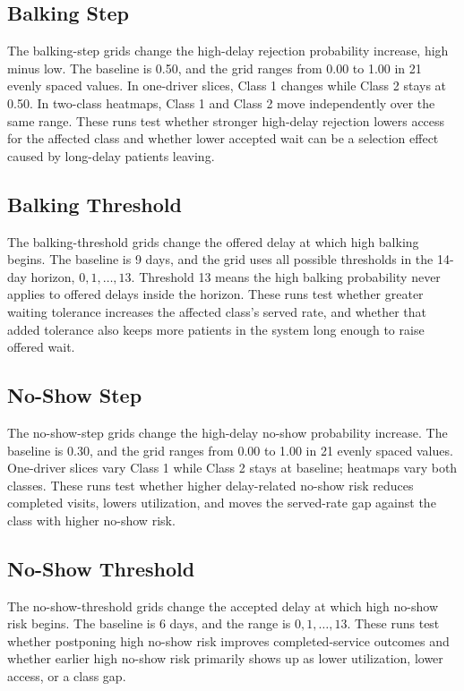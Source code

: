 \documentclass[11pt]{article}
\begin{document}
\subsection{Balking Step}
The balking-step grids change the high-delay rejection probability increase,
high minus low. The baseline is 0.50, and the grid ranges from 0.00 to 1.00 in
21 evenly spaced values. In one-driver slices, Class 1 changes while Class 2
stays at 0.50. In two-class heatmaps, Class 1 and Class 2 move independently
over the same range. These runs test whether stronger high-delay rejection
lowers access for the affected class and whether lower accepted wait can be a
selection effect caused by long-delay patients leaving.

\subsection{Balking Threshold}
The balking-threshold grids change the offered delay at which high balking
begins. The baseline is 9 days, and the grid uses all possible thresholds in the
14-day horizon, $0, 1, \ldots, 13$. Threshold 13 means the high balking
probability never applies to offered delays inside the horizon. These runs test
whether greater waiting tolerance increases the affected class's served rate,
and whether that added tolerance also keeps more patients in the system long
enough to raise offered wait.

\subsection{No-Show Step}
The no-show-step grids change the high-delay no-show probability increase. The
baseline is 0.30, and the grid ranges from 0.00 to 1.00 in 21 evenly spaced
values. One-driver slices vary Class 1 while Class 2 stays at baseline; heatmaps
vary both classes. These runs test whether higher delay-related no-show risk
reduces completed visits, lowers utilization, and moves the served-rate gap
against the class with higher no-show risk.

\subsection{No-Show Threshold}
The no-show-threshold grids change the accepted delay at which high no-show risk
begins. The baseline is 6 days, and the range is $0, 1, \ldots, 13$. These runs
test whether postponing high no-show risk improves completed-service outcomes
and whether earlier high no-show risk primarily shows up as lower utilization,
lower access, or a class gap.
\end{document}
